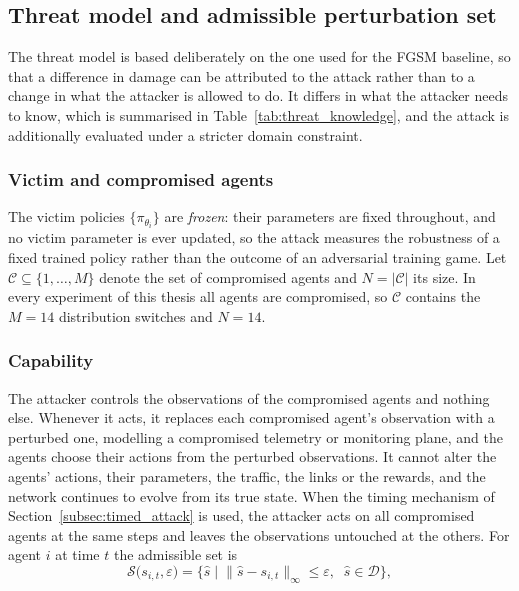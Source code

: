 \subsection{Threat model and admissible perturbation set}
\label{subsec:threat_model_pgd}

The threat model is based deliberately on the one used for the FGSM baseline, so that a
difference in damage can be attributed to the attack rather than to a change in what the
attacker is allowed to do. It differs in what the attacker needs to know, which is
summarised in Table~\ref{tab:threat_knowledge}, and the attack is additionally evaluated
under a stricter domain constraint.

\subsubsection*{Victim and compromised agents}

The victim policies $\{\pi_{\theta_i}\}$ are \emph{frozen}: their parameters are fixed
throughout, and no victim parameter is ever updated, so the attack measures the
robustness of a fixed trained policy rather than the outcome of an adversarial training
game. Let $\mathcal{C} \subseteq \{1,\dots,M\}$ denote the set of compromised agents and
$N = |\mathcal{C}|$ its size. In every experiment of this thesis all agents are
compromised, so $\mathcal{C}$ contains the $M = 14$ distribution switches and $N = 14$.

\subsubsection*{Capability}

The attacker controls the observations of the compromised agents and nothing else.
Whenever it acts, it replaces each compromised agent's observation with a perturbed one,
modelling a compromised telemetry or monitoring plane, and the agents choose their
actions from the perturbed observations. It cannot alter the agents' actions, their
parameters, the traffic, the links or the rewards, and the network continues to evolve
from its true state. When the timing mechanism of Section~\ref{subsec:timed_attack} is
used, the attacker acts on all compromised agents at the same steps and leaves the
observations untouched at the others. For agent $i$ at time $t$ the admissible set is
\begin{equation}
  \mathcal{S}\big(s_{i,t}, \varepsilon\big) =
  \Big\{ \hat{s} \;\Big|\;
    \big\| \hat{s} - s_{i,t} \big\|_{\infty} \le \varepsilon,
    \;\; \hat{s} \in \mathcal{D}
  \Big\},
  \label{eq:admissible_set}
\end{equation}

